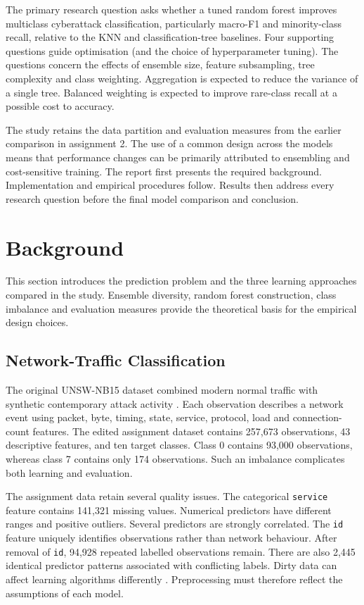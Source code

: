 \documentclass[conference]{IEEEtran}
\begin{document}
The primary research question asks whether a tuned random forest improves multiclass cyberattack classification, particularly macro-F1 and minority-class recall, relative to the KNN and classification-tree baselines. Four supporting questions guide optimisation (and the choice of hyperparameter tuning). The questions concern the effects of ensemble size, feature subsampling, tree complexity and class weighting. Aggregation is expected to reduce the variance of a single tree. Balanced weighting is expected to improve rare-class recall at a possible cost to accuracy.

The study retains the data partition and evaluation measures from the earlier comparison in assignment 2. The use of a common design across the models means that  performance changes can be primarily attributed to ensembling and cost-sensitive training. The report first presents the required background. Implementation and empirical procedures follow. Results then address every research question before the final model comparison and conclusion.

\section{Background}

This section introduces the prediction problem and the three learning approaches compared in the study. Ensemble diversity, random forest construction, class imbalance and evaluation measures provide the theoretical basis for the empirical  design choices.

\subsection{Network-Traffic Classification}

The original UNSW-NB15 dataset combined modern normal traffic with synthetic contemporary attack activity \cite{moustafa2015unsw}. Each observation describes a network event using packet, byte, timing, state, service, protocol, load and connection-count features. The edited assignment dataset contains 257,673 observations, 43 descriptive features, and ten target classes. Class 0 contains 93,000 observations, whereas class 7 contains only 174 observations. Such an imbalance complicates both learning and evaluation.

The assignment data retain several quality issues. The categorical \texttt{service} feature contains 141,321 missing values. Numerical predictors have different ranges and positive outliers. Several predictors are strongly correlated. The \texttt{id} feature uniquely identifies observations rather than network behaviour. After removal of \texttt{id}, 94,928 repeated labelled observations remain. There are also 2,445 identical predictor patterns associated with conflicting labels. Dirty data can affect learning algorithms differently \cite{qi2021impacts}. Preprocessing must therefore reflect the assumptions of each model.
\end{document}
